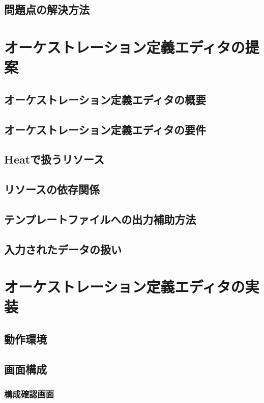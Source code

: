 \documentclass[mingoth]{kut-paper}		%
\begin{document}
	\section{問題点の解決方法}
	
	
\chapter{オーケストレーション定義エディタの提案}
%
	\section{オーケストレーション定義エディタの概要}
	
	\section{オーケストレーション定義エディタの要件}
	
	\section{Heatで扱うリソース}
	
	\section{リソースの依存関係}
	
	\section{テンプレートファイルへの出力補助方法}
	
	\section{入力されたデータの扱い}
	
	
\chapter{オーケストレーション定義エディタの実装}
	\section{動作環境}
	
	\section{画面構成}
	
		\subsection{構成確認画面}
		
\end{document}
